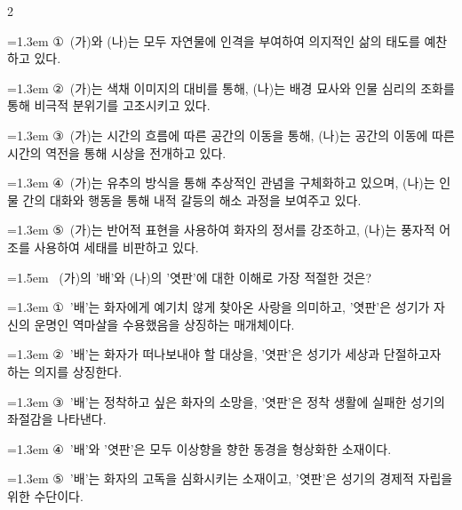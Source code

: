 \documentclass[10pt, a4paper]{article}
\begin{document}
\begin{multicols}{2}
\begin{minipage}{\columnwidth}
\vspace{0.5mm}
{\hangindent=1.3em  \noindent\hspace{0.3em}①~(가)와 (나)는 모두 자연물에 인격을 부여하여 의지적인 삶의 태도를 예찬하고 있다.\par}
{\hangindent=1.3em  \noindent\hspace{0.3em}②~(가)는 색채 이미지의 대비를 통해, (나)는 배경 묘사와 인물 심리의 조화를 통해 비극적 분위기를 고조시키고 있다.\par}
{\hangindent=1.3em  \noindent\hspace{0.3em}③~(가)는 시간의 흐름에 따른 공간의 이동을 통해, (나)는 공간의 이동에 따른 시간의 역전을 통해 시상을 전개하고 있다.\par}
{\hangindent=1.3em  \noindent\hspace{0.3em}④~(가)는 유추의 방식을 통해 추상적인 관념을 구체화하고 있으며, (나)는 인물 간의 대화와 행동을 통해 내적 갈등의 해소 과정을 보여주고 있다.\par}
{\hangindent=1.3em  \noindent\hspace{0.3em}⑤~(가)는 반어적 표현을 사용하여 화자의 정서를 강조하고, (나)는 풍자적 어조를 사용하여 세태를 비판하고 있다.\par}
\vspace{4mm}
\end{minipage}
\par

\noindent\begin{minipage}{\columnwidth}
\vspace{2mm}
{\hangindent=1.5em  ~(가)의 '배'와 (나)의 '엿판'에 대한 이해로 가장 적절한 것은?\par}

\vspace{0.5mm}
{\hangindent=1.3em  \noindent\hspace{0.3em}①~'배'는 화자에게 예기치 않게 찾아온 사랑을 의미하고, '엿판'은 성기가 자신의 운명인 역마살을 수용했음을 상징하는 매개체이다.\par}
{\hangindent=1.3em  \noindent\hspace{0.3em}②~'배'는 화자가 떠나보내야 할 대상을, '엿판'은 성기가 세상과 단절하고자 하는 의지를 상징한다.\par}
{\hangindent=1.3em  \noindent\hspace{0.3em}③~'배'는 정착하고 싶은 화자의 소망을, '엿판'은 정착 생활에 실패한 성기의 좌절감을 나타낸다.\par}
{\hangindent=1.3em  \noindent\hspace{0.3em}④~'배'와 '엿판'은 모두 이상향을 향한 동경을 형상화한 소재이다.\par}
{\hangindent=1.3em  \noindent\hspace{0.3em}⑤~'배'는 화자의 고독을 심화시키는 소재이고, '엿판'은 성기의 경제적 자립을 위한 수단이다.\par}
\vspace{4mm}
\end{minipage}
\par


\end{multicols}
\end{document}
